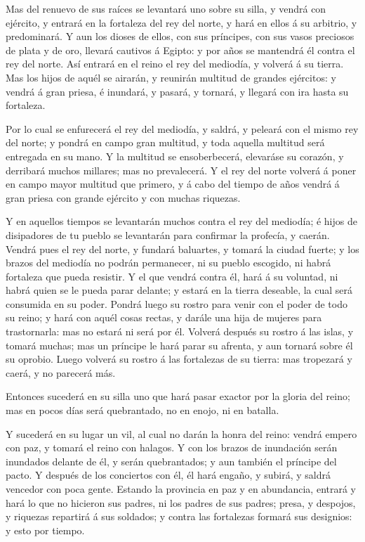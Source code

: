  Mas del renuevo de sus raíces se levantará uno sobre su
silla, y vendrá con ejército, y entrará en la fortaleza del rey del
norte, y hará en ellos á su arbitrio, y predominará.  Y aun
los dioses de ellos, con sus príncipes, con sus vasos preciosos de plata
y de oro, llevará cautivos á Egipto: y por años se mantendrá él contra
el rey del norte.  Así entrará en el reino el rey del
mediodía, y volverá á su tierra.  Mas los hijos de aquél se
airarán, y reunirán multitud de grandes ejércitos: y vendrá á gran
priesa, é inundará, y pasará, y tornará, y llegará con ira hasta su
fortaleza.

 Por lo cual se enfurecerá el rey del mediodía, y saldrá, y
peleará con el mismo rey del norte; y pondrá en campo gran multitud, y
toda aquella multitud será entregada en su mano.  Y la
multitud se ensoberbecerá, elevaráse su corazón, y derribará muchos
millares; mas no prevalecerá.  Y el rey del norte volverá á
poner en campo mayor multitud que primero, y á cabo del tiempo de años
vendrá á gran priesa con grande ejército y con muchas riquezas.

 Y en aquellos tiempos se levantarán muchos contra el rey
del mediodía; é hijos de disipadores de tu pueblo se levantarán para
confirmar la profecía, y caerán.  Vendrá pues el rey del
norte, y fundará baluartes, y tomará la ciudad fuerte; y los brazos del
mediodía no podrán permanecer, ni su pueblo escogido, ni habrá fortaleza
que pueda resistir.  Y el que vendrá contra él, hará á su
voluntad, ni habrá quien se le pueda parar delante; y estará en la
tierra deseable, la cual será consumida en su poder. 
Pondrá luego su rostro para venir con el poder de todo su reino; y hará
con aquél cosas rectas, y darále una hija de mujeres para trastornarla:
mas no estará ni será por él.  Volverá después su rostro á
las islas, y tomará muchas; mas un príncipe le hará parar su afrenta, y
aun tornará sobre él su oprobio.  Luego volverá su rostro á
las fortalezas de su tierra: mas tropezará y caerá, y no parecerá más.

 Entonces sucederá en su silla uno que hará pasar exactor
por la gloria del reino; mas en pocos días será quebrantado, no en
enojo, ni en batalla.

 Y sucederá en su lugar un vil, al cual no darán la honra
del reino: vendrá empero con paz, y tomará el reino con halagos.
 Y con los brazos de inundación serán inundados delante de
él, y serán quebrantados; y aun también el príncipe del pacto.
 Y después de los conciertos con él, él hará engaño, y
subirá, y saldrá vencedor con poca gente.  Estando la
provincia en paz y en abundancia, entrará y hará lo que no hicieron sus
padres, ni los padres de sus padres; presa, y despojos, y riquezas
repartirá á sus soldados; y contra las fortalezas formará sus designios:
y esto por tiempo.

